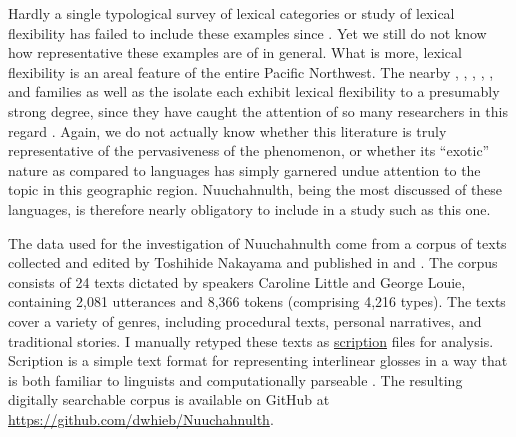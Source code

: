 Hardly a single typological survey of lexical categories or study of lexical flexibility has failed to include these examples since . Yet we still do not know how representative these examples are of  in general. What is more, lexical flexibility is an areal feature of the entire Pacific Northwest. The nearby , , , , , and  families as well as the isolate  each exhibit lexical flexibility to a presumably strong degree, since they have caught the attention of so many researchers in this regard . Again, we do not actually know whether this literature is truly representative of the pervasiveness of the phenomenon, or whether its \enquote{exotic} nature as compared to  languages has simply garnered undue attention to the topic in this geographic region. Nuuchahnulth, being the most discussed of these languages, is therefore nearly obligatory to include in a study such as this one.

The data used for the investigation of Nuuchahnulth come from a corpus of texts collected and edited by Toshihide Nakayama and published in \textcite{Little2003} and \textcite{Louie2003}. The corpus consists of 24 texts dictated by speakers Caroline Little and George Louie, containing 2,081 utterances and 8,366 tokens (comprising 4,216 types). The texts cover a variety of genres, including procedural texts, personal narratives, and traditional stories. I manually retyped these texts as \href{https://scription.digitallinguistics.io}{scription} files for analysis. Scription is a simple text format for representing interlinear glosses in a way that is both familiar to linguists and computationally parseable \parencite{Hieber2020b}. The resulting digitally searchable corpus is available on GitHub at \url{https://github.com/dwhieb/Nuuchahnulth}.

